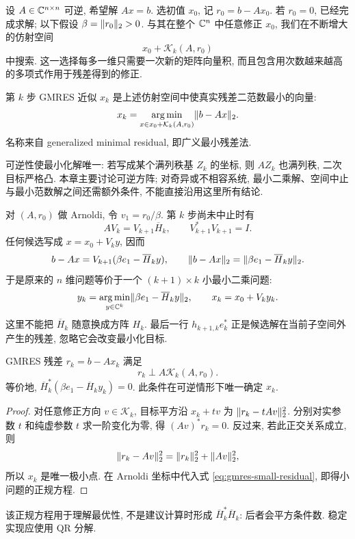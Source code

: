 \label{ch:gmres}
设 $A\in\mathbb C^{n\times n}$ 可逆, 希望解 $Ax=b$. 选初值 $x_0$, 记 $r_0=b-Ax_0$. 若 $r_0=0$, 已经完成求解; 以下假设 $\beta=\lVert r_0\rVert_2>0$. 与其在整个 $\mathbb C^n$ 中任意修正 $x_0$, 我们在不断增大的仿射空间
\[
x_0+\mathcal K_k(A,r_0)
\]
中搜索. 这一选择每多一维只需要一次新的矩阵向量积, 而且包含用次数越来越高的多项式作用于残差得到的修正.

\begin{definition}
第 $k$ 步 GMRES 近似 $x_k$ 是上述仿射空间中使真实残差二范数最小的向量:
\begin{equation}\label{eq:gmres-definition}
 x_k=\operatorname*{arg\,min}_{x\in x_0+\mathcal K_k(A,r_0)}\lVert b-Ax\rVert_2.
\end{equation}
名称来自 generalized minimal residual, 即广义最小残差法.
\end{definition}
可逆性使最小化解唯一: 若写成某个满列秩基 $Z_k$ 的坐标, 则 $AZ_k$ 也满列秩, 二次目标严格凸. 本章主要讨论可逆方阵; 对奇异或不相容系统, 最小二乘解、空间中止与最小范数解之间还需额外条件, 不能直接沿用这里所有结论.

对 $(A,r_0)$ 做 Arnoldi, 令 $v_1=r_0/\beta$. 第 $k$ 步尚未中止时有
\[
AV_k=V_{k+1}\overline H_k,
\qquad V_{k+1}^*V_{k+1}=I.
\]
任何候选写成 $x=x_0+V_ky$, 因而
\begin{equation}\label{eq:gmres-small-residual}
 b-Ax=V_{k+1}(\beta e_1-\overline H_ky),\qquad
 \lVert b-Ax\rVert_2=\lVert \beta e_1-\overline H_ky\rVert_2.
\end{equation}
于是原来的 $n$ 维问题等价于一个 $(k+1)\times k$ 小最小二乘问题:
\begin{equation}\label{eq:gmres-small-ls}
 y_k=\operatorname*{arg\,min}_{y\in\mathbb C^k}\lVert \beta e_1-\overline H_ky\rVert_2,
 \qquad x_k=x_0+V_ky_k.
\end{equation}
这里不能把 $\overline H_k$ 随意换成方阵 $H_k$. 最后一行 $h_{k+1,k}e_k^*$ 正是候选解在当前子空间外产生的残差, 忽略它会改变最小化目标.

\begin{proposition}[最小残差的正交条件]\label{prop:gmres-optimality}
GMRES 残差 $r_k=b-Ax_k$ 满足
\[
r_k\perp A\mathcal K_k(A,r_0).
\]
等价地, $\overline H_k^*(\beta e_1-\overline H_ky_k)=0$. 此条件在可逆情形下唯一确定 $x_k$.
\end{proposition}
\begin{proof}
对任意修正方向 $v\in\mathcal K_k$, 目标平方沿 $x_k+tv$ 为 $\lVert r_k-tAv\rVert_2^2$. 分别对实参数 $t$ 和纯虚参数 $t$ 求一阶变化为零, 得 $(Av)^*r_k=0$. 反过来, 若此正交关系成立, 则
\[
\lVert r_k-Av\rVert_2^2=\lVert r_k\rVert_2^2+\lVert Av\rVert_2^2,
\]
所以 $x_k$ 是唯一极小点. 在 Arnoldi 坐标中代入式 \eqref{eq:gmres-small-residual}, 即得小问题的正规方程.
\end{proof}
该正规方程用于理解最优性, 不是建议计算时形成 $\overline H_k^*\overline H_k$: 后者会平方条件数. 稳定实现应使用 QR 分解.

